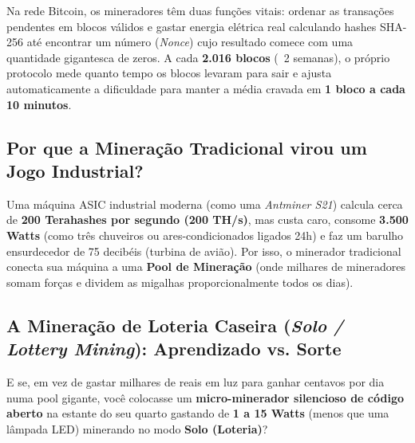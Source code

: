 \documentclass{pousadaguide}
\begin{document}
Na rede Bitcoin, os mineradores têm duas funções vitais: ordenar as transações pendentes em blocos válidos e gastar energia elétrica real calculando hashes SHA-256 até encontrar um número (\emph{Nonce}) cujo resultado comece com uma quantidade gigantesca de zeros. A cada \textbf{2.016 blocos} (~2 semanas), o próprio protocolo mede quanto tempo os blocos levaram para sair e ajusta automaticamente a dificuldade para manter a média cravada em \textbf{1 bloco a cada 10 minutos}.

\subsection{Por que a Mineração Tradicional virou um Jogo Industrial?}
Uma máquina ASIC industrial moderna (como uma \emph{Antminer S21}) calcula cerca de \textbf{200 Terahashes por segundo (200 TH/s)}, mas custa caro, consome \textbf{3.500 Watts} (como três chuveiros ou ares-condicionados ligados 24h) e faz um barulho ensurdecedor de 75 decibéis (turbina de avião). Por isso, o minerador tradicional conecta sua máquina a uma \textbf{Pool de Mineração} (onde milhares de mineradores somam forças e dividem as migalhas proporcionalmente todos os dias).

\subsection{A Mineração de Loteria Caseira (\emph{Solo / Lottery Mining}): Aprendizado vs. Sorte}

E se, em vez de gastar milhares de reais em luz para ganhar centavos por dia numa pool gigante, você colocasse um \textbf{micro-minerador silencioso de código aberto} na estante do seu quarto gastando de \textbf{1 a 15 Watts} (menos que uma lâmpada LED) minerando no modo \textbf{Solo (Loteria)}?
\end{document}
